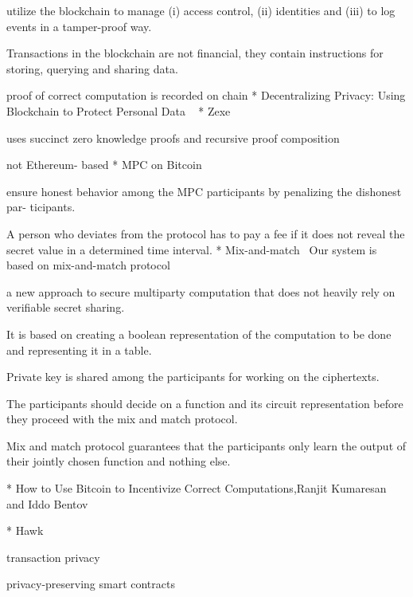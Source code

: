 utilize the blockchain to manage (i) access control, (ii) identities and (iii) to log events in a tamper-proof way.

Transactions in the blockchain are not financial, they contain instructions for storing, querying and sharing data.

proof of correct computation is recorded on chain
\newline
\newline
* Decentralizing Privacy: Using Blockchain to Protect Personal Data ~\cite{zyskind2015decentralizing}
\newline
\newline
* Zexe~\cite{bowe2020zexe}

uses succinct zero knowledge proofs and recursive proof composition

not Ethereum- based
\newline
\newline
* MPC on Bitcoin~\cite{andrychowicz2014secure}

ensure honest behavior among the MPC participants by penalizing the dishonest par- ticipants.

A person who deviates from the protocol has to pay a fee if it does not reveal the secret value in a determined time interval. 
\newline
\newline
* Mix-and-match~\cite{jakobsson2000mix}
Our system is based on mix-and-match protocol

a new approach to secure multiparty computation that does not heavily rely on verifiable secret sharing. 

It is based on creating a boolean representation of the computation to be done and representing it in a table. 

Private key is shared among the participants for working on the ciphertexts. 

The participants should decide on a function and its circuit representation before they proceed with the mix and match protocol.

Mix and match protocol guarantees that the participants only learn the output of their jointly chosen function and nothing else.

* How to Use Bitcoin to Incentivize Correct Computations,Ranjit Kumaresan and Iddo Bentov

* Hawk~\cite{kosba2016hawk}

transaction privacy

privacy-preserving smart contracts


